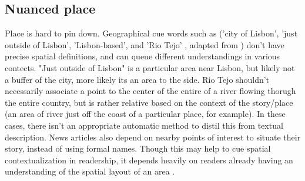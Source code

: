 \subsection{Nuanced place}
Place is hard to pin down. Geographical cue words such as ('city of Lisbon', 'just outside of Lisbon', 'Lisbon-based', and 'Rio Tejo' , adapted from \cite{Lieberman2010}) don't have precise spatial definitions, and can queue different understandings in various contects. %
"Just outside of Lisbon" is a particular area near Lisbon, but likely not a buffer of the city, more likely its an area to the side. Rio Tejo shouldn’t necessarily associate a point to the center of the entire of a river flowing thorugh the entire country, but is rather relative based on the context of the story/place (an area of river just off the coast of a particular place, for example). In these cases, there isn’t an appropriate automatic method to distil this from textual description.%
News articles also depend on nearby points of interest to situate their story, instead of using formal names. Though this may help to cue spatial contextualization in readership, it depends heavily on readers already having an understanding of the spatial layout of an area \cite{Lee2019}.%

